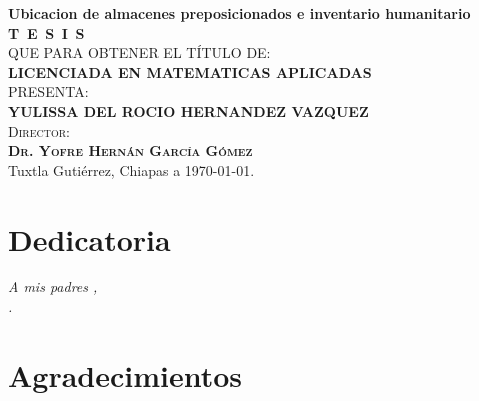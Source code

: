 \begin{titlepage}
\begin{minipage}[t][0.95\textheight][c]{0.76\textwidth}
            \begin{center}
                {\Large\bfseries Ubicacion de almacenes preposicionados e inventario humanitario}\\[2cm]
                \textsc{\huge \textbf{T\, E\, S\, I\, S}}\\[1.5cm]
                \textsc{\large QUE PARA OBTENER EL TÍTULO DE:}\\[0.3cm]
                \textbf{\textsc{LICENCIADA EN MATEMATICAS APLICADAS}}\\[1.5cm]
                \textsc{\large PRESENTA:}\\[0.3cm]
                \textbf{\textsc{\large {YULISSA DEL ROCIO HERNANDEZ VAZQUEZ}}}\\[2cm]
                {\large\scshape Director:\\[0.3cm]
                {\textbf{\large Dr. Yofre Hernán García Gómez }}}\\[2.0cm]
                \large{Tuxtla Gutiérrez, Chiapas a \today.}

            \end{center}
\end{minipage}
\end{titlepage}

\pagebreak[2]

\chapter*{Dedicatoria}
\begin{flushright}
\textit{A mis padres , \\.}
\end{flushright}


\chapter*{Agradecimientos}